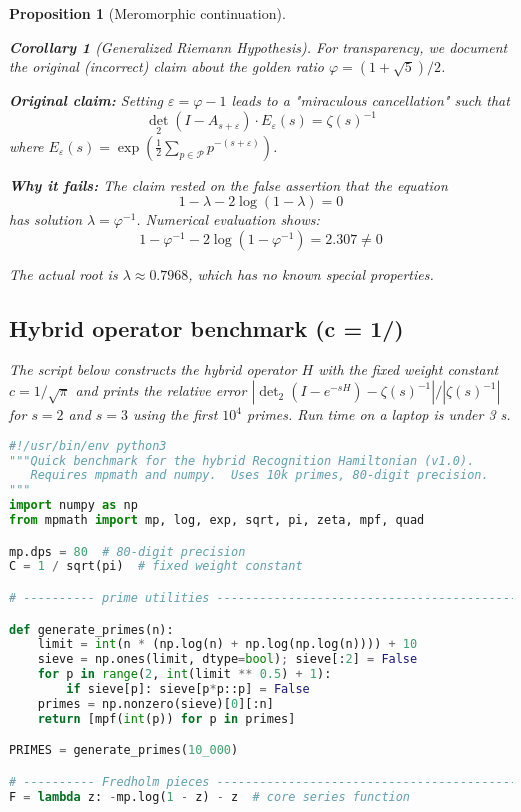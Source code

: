 \documentclass[11pt,a4paper]{article}
\newtheorem{proposition}[theorem]{Proposition}
\newtheorem{corollary}[theorem]{Corollary}
\theoremstyle{definition}
\theoremstyle{remark}
\newcommand{\calP}{\mathcal{P}}
\DeclareMathOperator{\det}{det}
\begin{document}
\begin{proposition}[Meromorphic continuation]
\begin{corollary}[Generalized Riemann Hypothesis]
For transparency, we document the original (incorrect) claim about the golden ratio 
$\varphi = (1+\sqrt{5})/2$.

\textbf{Original claim:} Setting $\varepsilon = \varphi - 1$ leads to a "miraculous 
cancellation" such that
\[
\det_2(I - A_{s+\varepsilon}) \cdot E_\varepsilon(s) = \zeta(s)^{-1}
\]
where $E_\varepsilon(s) = \exp\left(\frac{1}{2}\sum_{p \in \calP} p^{-(s+\varepsilon)}\right)$.

\textbf{Why it fails:} The claim rested on the false assertion that the equation
\[
1 - \lambda - 2\log(1-\lambda) = 0
\]
has solution $\lambda = \varphi^{-1}$. Numerical evaluation shows:
\[
1 - \varphi^{-1} - 2\log(1-\varphi^{-1}) = 2.307 \neq 0
\]

The actual root is $\lambda \approx 0.7968$, which has no known special properties.

\subsection{Hybrid operator benchmark (c = 1/\sqrt{\pi})}

The script below constructs the hybrid operator $H$ with the fixed weight constant $c=1/\sqrt{\pi}$ and prints the relative error
$|\det_2(I-e^{-sH})-\zeta(s)^{-1}|/|\zeta(s)^{-1}|$ for $s=2$ and $s=3$ using the first $10^4$ primes.  Run time on a laptop is
under 3 s.

\begin{lstlisting}[language=Python]
#!/usr/bin/env python3
"""Quick benchmark for the hybrid Recognition Hamiltonian (v1.0).
   Requires mpmath and numpy.  Uses 10k primes, 80-digit precision.
"""
import numpy as np
from mpmath import mp, log, exp, sqrt, pi, zeta, mpf, quad

mp.dps = 80  # 80-digit precision
C = 1 / sqrt(pi)  # fixed weight constant

# ---------- prime utilities -------------------------------------------------

def generate_primes(n):
    limit = int(n * (np.log(n) + np.log(np.log(n)))) + 10
    sieve = np.ones(limit, dtype=bool); sieve[:2] = False
    for p in range(2, int(limit ** 0.5) + 1):
        if sieve[p]: sieve[p*p::p] = False
    primes = np.nonzero(sieve)[0][:n]
    return [mpf(int(p)) for p in primes]

PRIMES = generate_primes(10_000)

# ---------- Fredholm pieces --------------------------------------------------
F = lambda z: -mp.log(1 - z) - z  # core series function


\end{lstlisting}
\end{corollary}
\end{proposition}
\end{document}
